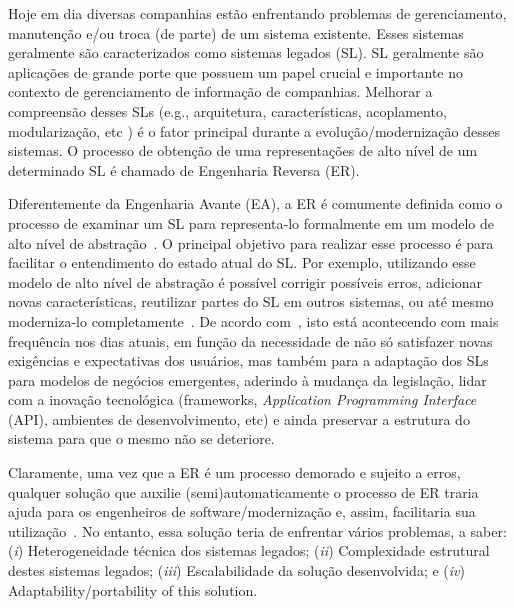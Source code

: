 Hoje em dia diversas companhias estão enfrentando problemas de gerenciamento, manutenção e/ou troca (de parte) de um sistema existente. Esses sistemas geralmente são caracterizados como sistemas legados (SL). SL geralmente são aplicações de grande porte que possuem um papel crucial e importante no contexto de gerenciamento de informação de companhias. Melhorar a compreensão desses SLs (e.g., arquitetura, características, acoplamento, modularização, etc ) é o fator principal durante a evolução/modernização desses sistemas. O processo de obtenção de uma representações de alto nível de um determinado SL é chamado de Engenharia Reversa (ER).

Diferentemente da Engenharia Avante (EA), a ER é comumente definida como o processo de examinar um SL para representa-lo formalmente em um modelo de alto nível de abstração~\citep{Reverse_engineering_and_Design_Recovery_A_Taxonomy}. O principal objetivo para realizar esse processo é para facilitar o entendimento do estado atual do SL. Por exemplo, utilizando esse modelo de alto nível de abstração é possível corrigir possíveis erros, adicionar novas características, reutilizar partes do SL em outros sistemas, ou até mesmo moderniza-lo completamente~\citep{Griffith2011}. De acordo com~\cite{Achievements_and_Challenges_in_Software_Reverse_Engineering}, isto está acontecendo com mais frequência nos dias atuais, em função da necessidade de não só satisfazer novas exigências e expectativas dos usuários, mas também para a adaptação dos SLs para modelos de negócios emergentes, aderindo à mudança da legislação, lidar com a inovação tecnológica (frameworks, \textit{Application Programming Interface} (API), ambientes de desenvolvimento, etc) e ainda preservar a estrutura do sistema para que o mesmo não se deteriore.

Claramente, uma vez que a ER é um processo demorado e sujeito a erros, qualquer solução que auxilie (semi)automaticamente o processo de ER traria ajuda para os engenheiros de software/modernização e, assim, facilitaria sua utilização~\citep{ADMCHAPTERR, ADMBook}. No entanto, essa solução teria de enfrentar vários problemas, a saber: (\textit{i}) Heterogeneidade técnica dos sistemas legados; (\textit{ii}) Complexidade estrutural destes sistemas legados; (\textit{iii}) Escalabilidade da solução desenvolvida; e (\textit{iv}) Adaptability/portability of this solution.

